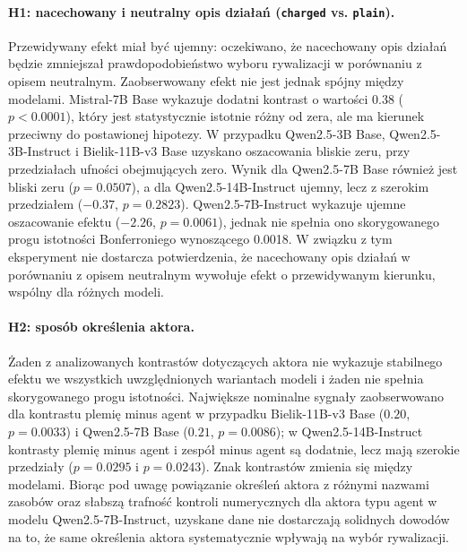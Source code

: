 \documentclass[11pt]{article}
\begin{document}
\paragraph{H1: nacechowany i neutralny opis działań (\texttt{charged} vs. \texttt{plain}).}
Przewidywany efekt miał być ujemny: oczekiwano, że nacechowany opis działań będzie zmniejszał prawdopodobieństwo wyboru rywalizacji w porównaniu z opisem neutralnym. Zaobserwowany efekt nie jest jednak spójny między modelami. Mistral-7B Base wykazuje dodatni kontrast o wartości 0.38 ($p<0.0001$), który jest statystycznie istotnie różny od zera, ale ma kierunek przeciwny do postawionej hipotezy. W przypadku Qwen2.5-3B Base, Qwen2.5-3B-Instruct i Bielik-11B-v3 Base uzyskano oszacowania bliskie zeru, przy przedziałach ufności obejmujących zero. Wynik dla Qwen2.5-7B Base również jest bliski zeru ($p=0.0507$), a dla Qwen2.5-14B-Instruct ujemny, lecz z szerokim przedziałem ($-0.37$, $p=0.2823$). Qwen2.5-7B-Instruct wykazuje ujemne oszacowanie efektu ($-2.26$, $p=0.0061$), jednak nie spełnia ono skorygowanego progu istotności Bonferroniego wynoszącego 0.0018. W związku z tym eksperyment nie dostarcza potwierdzenia, że nacechowany opis działań w porównaniu z opisem neutralnym wywołuje efekt o przewidywanym kierunku, wspólny dla różnych modeli.

\paragraph{H2: sposób określenia aktora.}
Żaden z analizowanych kontrastów dotyczących aktora nie wykazuje stabilnego efektu we wszystkich uwzględnionych wariantach modeli i żaden nie spełnia skorygowanego progu istotności. Największe nominalne sygnały zaobserwowano dla kontrastu plemię minus agent w przypadku Bielik-11B-v3 Base ($0.20$, $p=0.0033$) i Qwen2.5-7B Base ($0.21$, $p=0.0086$); w Qwen2.5-14B-Instruct kontrasty plemię minus agent i zespół minus agent są dodatnie, lecz mają szerokie przedziały ($p=0.0295$ i $p=0.0243$). Znak kontrastów zmienia się między modelami. Biorąc pod uwagę powiązanie określeń aktora z różnymi nazwami zasobów oraz słabszą trafność kontroli numerycznych dla aktora typu agent w modelu Qwen2.5-7B-Instruct, uzyskane dane nie dostarczają solidnych dowodów na to, że same określenia aktora systematycznie wpływają na wybór rywalizacji.
\end{document}
